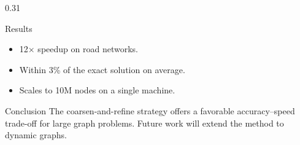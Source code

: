 \documentclass[final]{beamer}
\begin{document}
\begin{frame}[t]
\begin{columns}[t]
\begin{column}{0.31\paperwidth}
  \begin{block}{Results}
    \begin{itemize}
      \item 12$\times$ speedup on road networks.
      \item Within 3\% of the exact solution on average.
      \item Scales to 10M nodes on a single machine.
    \end{itemize}
  \end{block}

  \begin{block}{Conclusion}
    The coarsen-and-refine strategy offers a favorable
    accuracy--speed trade-off for large graph problems.
    Future work will extend the method to dynamic graphs.
  \end{block}
\end{column}

\end{columns}

\end{frame}
\end{document}

